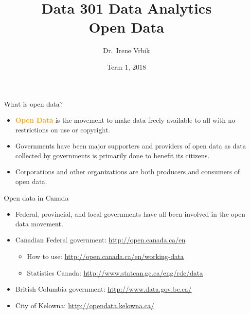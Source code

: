 \documentclass[xcolor=svgnames]{beamer}
\title
  [Data 301 Data Analytics\hspace{2em}]
  {Data 301 Data Analytics\\
  Open Data}
\author
  [Dr.\ Irene Vrbik]
  {Dr.\ Irene Vrbik}
\date
  {Term 1, 2018}
\institute
  {University of British Columbia Okanagan \newline irene.vrbik@ubc.ca}
\newcommand{\nl}{\\[1em]}
\newcommand{\define}[1]{\textbf{\textcolor{orange}{#1}}}
\begin{document}
\maketitle




\begin{frame}
  {What is open data?}

  \begin{itemize}
  \item \define{Open Data} is the movement to make data freely available to all with no restrictions on use or copyright.\nl

\item Governments have been major supporters and providers of open data as data collected by governments is primarily done to benefit its citizens.\nl

\item Corporations and other organizations are both producers and consumers of open data.

  \end{itemize}
\end{frame}


\begin{frame}{Open data in Canada}
\begin{itemize}
\item Federal, provincial, and local governments have all been involved in the open data movement.\nl

\item Canadian Federal government: \url{http://open.canada.ca/en}
\begin{itemize}
\item How to use: \url{http://open.canada.ca/en/working-data}
\item Statistics Canada: \url{http://www.statcan.gc.ca/eng/rdc/data}\nl
\end{itemize}

\item British Columbia government: \url{http://www.data.gov.bc.ca/}\nl

\item City of Kelowna: \url{http://opendata.kelowna.ca/}
\end{itemize}
\end{frame}
\end{document}
